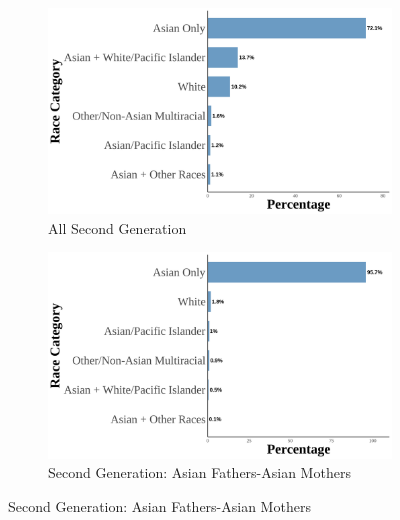 \begin{landscape}
\begin{figure}[!htb]
\centering
\caption{Asian Racial Identity: Second Generation}
\label{fig:histogram-secondgen}

\begin{subfigure}{.48\textwidth}
\caption{All Second Generation}
\centering
\includegraphics[width=1\linewidth]{histogram_asian_american_race_secondgen.png}
\end{subfigure}
\hfill
\begin{subfigure}{.48\textwidth}
\caption{Second Generation: Asian Fathers-Asian Mothers}
\centering
\includegraphics[width=1\linewidth]{histogram_asian_american_race_secondgen_AA.png}
\end{subfigure}

\vspace{1cm}


\end{figure}
\end{landscape}

